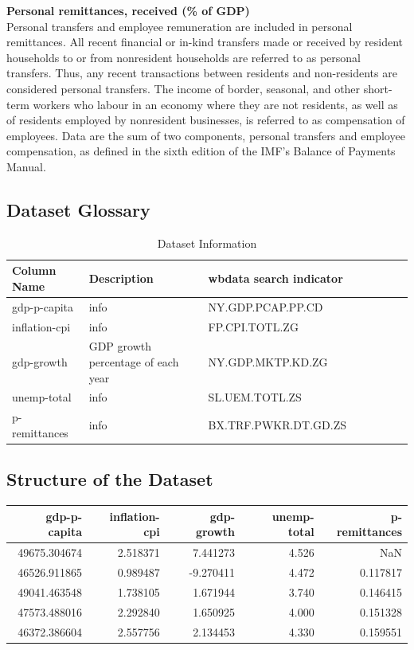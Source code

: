 \textbf{Personal remittances, received (\% of GDP)}\\
Personal transfers and employee remuneration are included in personal remittances. All recent financial or in-kind transfers made or received by resident households to or from nonresident households are referred to as personal transfers. Thus, any recent transactions between residents and non-residents are considered personal transfers. The income of border, seasonal, and other short-term workers who labour in an economy where they are not residents, as well as of residents employed by nonresident businesses, is referred to as compensation of employees. Data are the sum of two components, personal transfers and employee compensation, as defined in the sixth edition of the IMF's Balance of Payments Manual.\\

\subsection{Dataset Glossary}
\begin{table}[ht]
\centering
\caption{Dataset Information}
\label{tab2}
\begin{tabular}{llllllll}
 \hline
Column Name & Description & wbdata search indicator\\
\hline
 gdp-p-capita & info & NY.GDP.PCAP.PP.CD \\
 inflation-cpi & info & FP.CPI.TOTL.ZG \\
 gdp-growth & GDP growth percentage of each year & NY.GDP.MKTP.KD.ZG \\
 unemp-total & info & SL.UEM.TOTL.ZS \\
 p-remittances & info & BX.TRF.PWKR.DT.GD.ZS \\
\hline
\end{tabular}
\end{table}

\subsection{Structure of the Dataset}
\begin{tabular}{rrrrr}
\toprule
 gdp-p-capita &  inflation-cpi &  gdp-growth &  unemp-total &  p-remittances \\
 \midrule
 49675.304674 &       2.518371 &    7.441273 &                4.526 &                   NaN \\
 46526.911865 &       0.989487 &   -9.270411 &                4.472 &              0.117817 \\
 49041.463548 &       1.738105 &    1.671944 &                3.740 &              0.146415 \\
 47573.488016 &       2.292840 &    1.650925 &                4.000 &              0.151328 \\
 46372.386604 &       2.557756 &    2.134453 &                4.330 &              0.159551 \\
\bottomrule
\end{tabular}

